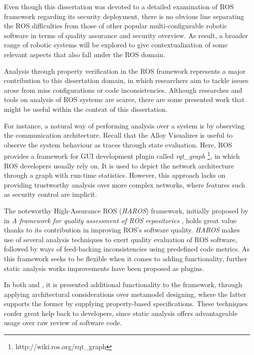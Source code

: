 Even though this dissertation was devoted to a detailed examination of ROS framework regarding its security deployment, there is no obvious line separating the ROS difficulties from those of other popular multi-configurable robotic software in terms of quality assurance and security overview. As result, a broader range of robotic systems will be explored to give contextualization of some relevant aspects that also fall under the ROS domain.

Analysis through property verification in the ROS framework represents a major contribution to this dissertation domain, in which researchers aim to tackle issues arose from miss configurations or code inconsistencies. Although researches and tools on analysis of ROS systems are scarce, there are some presented work that might be useful within the context of this dissertation.

For instance, a natural way of performing analysis over a system is by observing the communication architecture. Recall that the Alloy Visualizer is useful to observe the system behaviour as traces through state evaluation. Here, ROS provides a framework for GUI development plugin called \textit{rqt\_graph} \footnote[2]{http://wiki.ros.org/rqt\_graph}, in which ROS developers usually rely on. It is used to depict the network architecture through a graph with run-time statistics. However, this approach lacks on providing trustworthy analysis over more complex networks, where features such as security control are implicit.

The noteworthy High-Assurance ROS (\textit{HAROS}) framework, initially proposed by \citeauthor{santos2016framework} in \textit{A framework for quality assessment of ROS repositories} \cite{santos2016framework}, holds great value thanks to its contribution in improving ROS's software quality. \textit{HAROS} makes use of several analysis techniques to exert quality evaluation of ROS software, followed by ways of feed-backing inconsistencies using predefined code metrics. As this framework seeks to be flexible when it comes to adding functionality, further static analysis works improvements have been proposed as plugins.

In both  and , it is presented additional functionality to the framework, through applying architectural considerations over metamodel designing, where the latter supports the former by supplying property-based specifications. These techniques confer great help back to developers, since static analysis offers advantageable usage over raw review of software code. 

